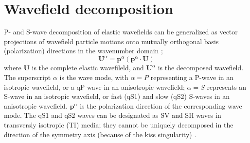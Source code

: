 \documentclass[manuscript,ulem,graphix,revised]{geophysics}
\begin{document}


\section {Wavefield decomposition}
\indent\indent
P- and S-wave decomposition of elastic wavefields can be generalized as vector projections of wavefield particle motions onto mutually orthogonal basis (polarization) directions in the wavenumber domain \citep{zhang10};
\begin{equation}
\boldsymbol{U}^\alpha=\boldsymbol{p}^\alpha(\boldsymbol{p}^\alpha\cdot\boldsymbol{U})
\label{eqn:dec}
\end{equation}
where $\boldsymbol{U}$ is the complete elastic wavefileld, and ${\boldsymbol{U}}^\alpha$ is the decomposed wavefield. The superscript $\alpha$ is the wave mode, with $\alpha=P$ representing a P-wave in an isotropic wavefield, or a qP-wave in an anisotropic wavefield; $\alpha=S$ represents an S-wave in an isotropic wavefield, or fast (qS1) and slow (qS2) S-waves in an anisotropic wavefield. $\boldsymbol{p}^\alpha$ is the polarization direction of the corresponding wave mode. 
The qS1 and qS2 waves can be designated as SV and SH waves in transversly isotropic (TI) media; they cannot be uniquely decomposed in the direction of the symmetry axis (because of the kiss singularity)
\citep{zhang10,Sripanich16,cheng14}.
\end{document}
